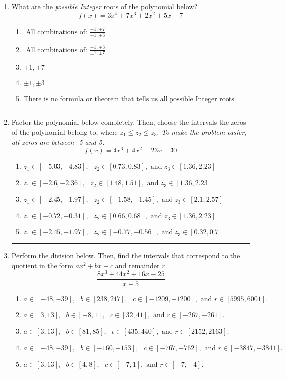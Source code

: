 \documentclass[14pt]{extbook}
\newcommand{\litem}[1]{\item#1\hspace*{-1cm}\rule{\textwidth}{0.4pt}}
\begin{document}
\begin{enumerate}
{\begin{enumerate}[label=\Alph*.]
\end{enumerate} }
\litem{
What are the \textit{possible Integer} roots of the polynomial below?\[ f(x) = 3x^{4} +7 x^{3} +2 x^{2} +5 x + 7 \]\begin{enumerate}[label=\Alph*.]
\item \( \text{ All combinations of: }\frac{\pm 1,\pm 7}{\pm 1,\pm 3} \)
\item \( \text{ All combinations of: }\frac{\pm 1,\pm 3}{\pm 1,\pm 7} \)
\item \( \pm 1,\pm 7 \)
\item \( \pm 1,\pm 3 \)
\item \( \text{There is no formula or theorem that tells us all possible Integer roots.} \)

\end{enumerate} }
\litem{
Factor the polynomial below completely. Then, choose the intervals the zeros of the polynomial belong to, where $z_1 \leq z_2 \leq z_3$. \textit{To make the problem easier, all zeros are between -5 and 5.}\[ f(x) = 4x^{3} +4 x^{2} -23 x -30 \]\begin{enumerate}[label=\Alph*.]
\item \( z_1 \in [-5.03, -4.83], \text{   }  z_2 \in [0.73, 0.83], \text{   and   } z_3 \in [1.36, 2.23] \)
\item \( z_1 \in [-2.6, -2.36], \text{   }  z_2 \in [1.48, 1.51], \text{   and   } z_3 \in [1.36, 2.23] \)
\item \( z_1 \in [-2.45, -1.97], \text{   }  z_2 \in [-1.58, -1.45], \text{   and   } z_3 \in [2.1, 2.57] \)
\item \( z_1 \in [-0.72, -0.31], \text{   }  z_2 \in [0.66, 0.68], \text{   and   } z_3 \in [1.36, 2.23] \)
\item \( z_1 \in [-2.45, -1.97], \text{   }  z_2 \in [-0.77, -0.56], \text{   and   } z_3 \in [0.32, 0.7] \)

\end{enumerate} }
\litem{
Perform the division below. Then, find the intervals that correspond to the quotient in the form $ax^2+bx+c$ and remainder $r$.\[ \frac{8x^{3} +44 x^{2} +16 x -25}{x + 5} \]\begin{enumerate}[label=\Alph*.]
\item \( a \in [-48, -39], \text{   } b \in [238, 247], \text{   } c \in [-1209, -1200], \text{   and   } r \in [5995, 6001]. \)
\item \( a \in [3, 13], \text{   } b \in [-8, 1], \text{   } c \in [32, 41], \text{   and   } r \in [-267, -261]. \)
\item \( a \in [3, 13], \text{   } b \in [81, 85], \text{   } c \in [435, 440], \text{   and   } r \in [2152, 2163]. \)
\item \( a \in [-48, -39], \text{   } b \in [-160, -153], \text{   } c \in [-767, -762], \text{   and   } r \in [-3847, -3841]. \)
\item \( a \in [3, 13], \text{   } b \in [4, 8], \text{   } c \in [-7, 1], \text{   and   } r \in [-7, -4]. \)


\end{enumerate}}
\end{enumerate}
\end{document}
